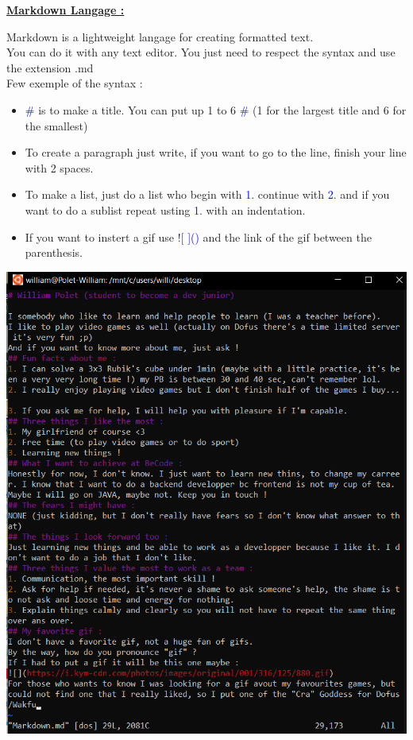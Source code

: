 \documentclass{article}
\begin{document}
\newpage
\begin{center}
    \LARGE{\bf \underline {Markdown Langage :}} \\
\end{center}
Markdown is a lightweight langage for creating formatted text. \\
You can do it with any text editor. You just need to respect the syntax and use the extension .md \\
Few exemple of the syntax :
\begin{itemize}
    \item \textcolor{blue}{\#} is to make a title. You can put up 1 to 6 \textcolor{blue}{\#} (1 for the largest title and 6 for the smallest)
    \item To create a paragraph just write, if you want to go to the line, finish your line with 2 spaces.
    \item To make a list, just do a list who begin with \textcolor{blue}{1.} continue with \textcolor{blue}{2.} and if you want to do a sublist repeat usting \textcolor{blue}{1.} with an indentation.
    \item If you want to instert a gif use \textcolor{blue}{![  ]()} and the link of the gif between the parenthesis.
\end{itemize}
\begin{center}
    \includegraphics[scale=1]{VimMarkdown.png}    
\end{center}
\end{document}

